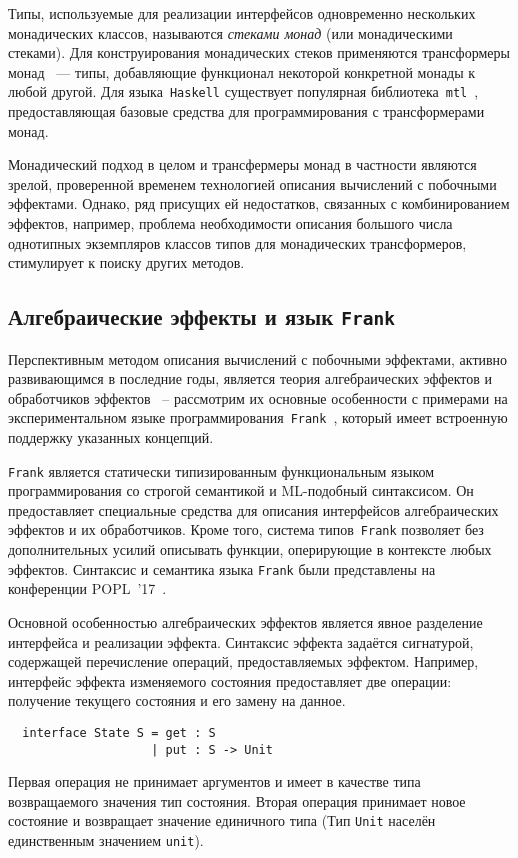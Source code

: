 \documentclass [a4paper] {article}
\begin{document}
Типы, используемые для реализации интерфейсов одновременно нескольких
монадических классов, называются \emph{стеками монад} (или монадическими стеками). Для конструирования
монадических стеков применяются трансформеры монад~\cite{monadTransformers}
--- типы,
добавляющие функционал некоторой конкретной монады к любой другой. Для
языка~\texttt{Haskell} существует популярная библиотека~\texttt{mtl}~\cite{mtlHackage},
предоставляющая базовые средства для программирования с трансформерами монад.

Монадический подход в целом и трансфермеры монад в частности являются зрелой,
проверенной временем технологией описания вычислений с побочными эффектами.
Однако, ряд присущих ей недостатков, связанных с комбинированием эффектов,
например, проблема необходимости описания большого числа однотипных
экземпляров классов типов для монадических трансформеров, стимулирует к поиску других методов.

\subsection{Алгебраические эффекты и язык \texttt{Frank}}

Перспективным методом описания вычислений с побочными эффектами, активно
развивающимся в последние годы, является теория алгебраических
эффектов и обработчиков эффектов~\cite{AlgEffects} -- рассмотрим их основные особенности с примерами на экспериментальном языке
программирования~\texttt{Frank}~\cite{Frank}, который имеет встроенную
поддержку указанных концепций.

\texttt{Frank} является статически типизированным функциональным
языком программирования со строгой семантикой и ML-подобный синтаксисом. Он предоставляет специальные средства для
описания интерфейсов алгебраических эффектов и их обработчиков.
Кроме того, система типов~\texttt{Frank} позволяет без дополнительных усилий описывать
функции, оперирующие в контексте любых эффектов. Синтаксис и семантика языка
\texttt{Frank} были представлены на конференции POPL~'17~\cite{Frank}.

Основной особенностью алгебраических эффектов является явное разделение
интерфейса и реализации эффекта. Синтаксис эффекта задаётся сигнатурой,
содержащей перечисление операций, предоставляемых эффектом. Например, интерфейс
эффекта изменяемого состояния предоставляет две операции: получение текущего
состояния и его замену на данное.
\begin{verbatim}
  interface State S = get : S
                    | put : S -> Unit
\end{verbatim}
Первая операция не принимает аргументов и имеет в качестве типа возвращаемого
значения тип состояния. Вторая операция принимает новое состояние и возвращает
значение единичного типа (Тип \texttt{Unit} населён единственным значением
\texttt{unit}).
\end{document}
